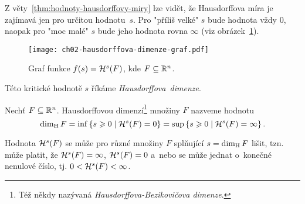 Z věty~\ref{thm:hodnoty-hausdorffovy-miry} lze vidět, že Hausdorffova míra je zajímavá jen pro určitou hodnotu~$s$. Pro "příliš velké" $s$ bude hodnota vždy $0$, naopak pro "moc malé" $s$ bude jeho hodnota rovna $\infty$ (viz obrázek~\ref{fig:hausdorffova-dimenze-graf}).
\begin{figure}[h]
    \centering
    \texttt{[image: ch02-hausdorffova-dimenze-graf.pdf]}
    \caption{Graf funkce $f(s)=\mathcal{H}^{s}(F)$, kde $F\subseteq\mathbb{R}^n$.}
    \label{fig:hausdorffova-dimenze-graf}
\end{figure}
Této kritické hodnotě $s$ říkáme \emph{Hausdorffova~dimenze}.
\begin{definition}\label{def:hausdorffova-dimenze}
    Nechť $F\subseteq\mathbb{R}^n$. Hausdorffovou dimenzí\footnote{Též někdy nazývaná \emph{Hausdorffova-Bezikovičova dimenze}. } množiny $F$ nazveme hodnotu
    \[\operatorname{dim_H}{F}=\inf\left\{s\geqslant 0\mid\mathcal{H}^{s}(F)=0\right\}=\sup\left\{s\geqslant 0\mid\mathcal{H}^{s}(F)=\infty\right\}.\]
\end{definition}
Hodnota $\mathcal{H}^{s}(F)$ se může pro různé množiny $F$ splňující $s=\operatorname{dim_H}{F}$ lišit, tzn. může platit, že $\mathcal{H}^{s}(F)=\infty$, $\mathcal{H}^{s}(F)=0$ a~nebo se může jednat o~konečné nenulové číslo, tj. $0<\mathcal{H}^{s}(F)<\infty$.

